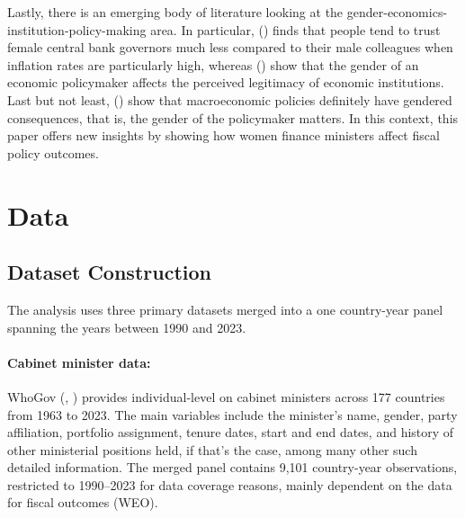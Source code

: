 \documentclass[12pt]{article}
\renewcommand{\citet}[1]{\textit{\citeauthor{#1}} (\citeyear{#1})}
\renewcommand{\citep}[1]{(\textit{\citeauthor{#1}}, \citeyear{#1})}
\begin{document}
Lastly, there is an emerging body of literature looking at the gender-economics-institution-policy-making area. In particular, \citet{bodea2025} finds that people tend to trust female central bank governors much less compared to their male colleagues when inflation rates are particularly high, whereas \citet{mcdowell2024} show that the gender of an economic policymaker affects the perceived legitimacy of economic institutions. Last but not least, \citet{flamini2023} show that macroeconomic policies definitely have gendered consequences, that is, the gender of the policymaker matters. In this context, this paper offers new insights by showing how women finance ministers affect fiscal policy outcomes.


\section{Data}
\label{sec:data}

\subsection{Dataset Construction}

The analysis uses three primary datasets merged into a one country-year panel spanning the years between 1990 and 2023.

\paragraph{Cabinet minister data:}
WhoGov \citep{nyrup2020} provides individual-level on cabinet ministers across 177 countries from 1963 to 2023. The main variables include the minister's name, gender, party affiliation, portfolio assignment, tenure dates, start and end dates, and history of other ministerial positions held, if that's the case, among many other such detailed information. The merged panel contains 9,101 country-year observations, restricted to 1990--2023 for data coverage reasons, mainly dependent on the data for fiscal outcomes (WEO).
\end{document}
